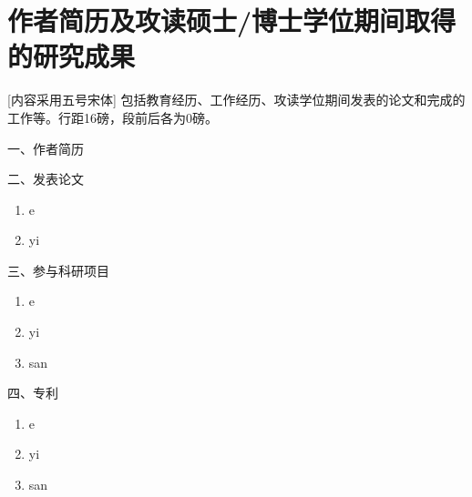 	\chapter*{作者简历及攻读硕士/博士学位期间取得的研究成果}
	[内容采用五号宋体]  包括教育经历、工作经历、攻读学位期间发表的论文和完成的工作等。行距16磅，段前后各为0磅。
	
一、作者简历
	\vspace{4em}
	
	
二、发表论文
	\setlength\leftmargini{3.5em}
	\renewcommand\labelenumi{[\theenumi]}
	\begin{enumerate}
		\item e
		\item yi
	\end{enumerate}

	三、参与科研项目
	\begin{enumerate}
		\item e
		\item yi
		\item san
	\end{enumerate}

	四、专利
	\begin{enumerate}
		\item e
		\item yi
		\item san
	\end{enumerate}